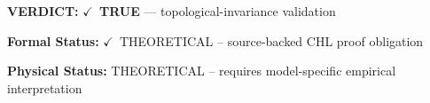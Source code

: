 \textbf{VERDICT:} \ensuremath{\checkmark}\ \textbf{TRUE} --- topological-invariance validation

\textbf{Formal Status:} \ensuremath{\checkmark}\ THEORETICAL -- source-backed CHL proof obligation

\textbf{Physical Status:} THEORETICAL -- requires model-specific empirical interpretation
\par\vspace{0.45em}
\par
\ifTZPDarkEdition
{}
\fi
\endgroup
\endgroup
